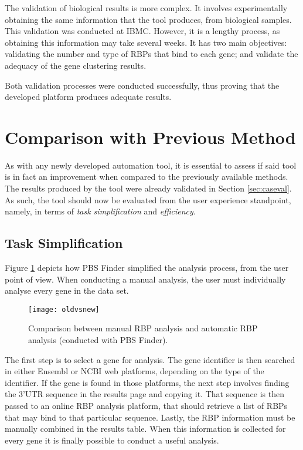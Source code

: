 The validation of biological results is more complex. It involves experimentally
obtaining the same information that the tool produces, from biological samples.
This validation was conducted at IBMC. However, it is a lengthy process, as
obtaining this information may take several weeks. It has two main objectives:
validating the number and type of RBPs that bind to each gene; and validate the
adequacy of the gene clustering results.

Both validation processes were conducted successfully, thus proving that the
developed platform produces adequate results.

\section{Comparison with Previous Method}\label{sec:caseperf}

As with any newly developed automation tool, it is essential to assess if said
tool is in fact an improvement when compared to the previously available
methods. The results produced by the tool were already validated in Section
\ref{sec:caseval}. As such, the tool should now be evaluated from the user
experience standpoint, namely, in terms of \emph{task simplification} and
\emph{efficiency}.

\subsection{Task Simplification}

Figure \ref{fig:oldvsnew} depicts how PBS Finder simplified the analysis process,
from the user point of view. When conducting a manual analysis, the user must
individually analyse every gene in the data set.

\begin{figure}[!htb]
  \begin{center}
    \leavevmode
    \texttt{[image: oldvsnew]}
    \caption[Comparison between manual RBP analysis and automatic RBP analysis (conducted with PBS Finder)]{
      Comparison between manual RBP analysis and automatic RBP analysis
      (conducted with PBS Finder).
    }
    \label{fig:oldvsnew}
  \end{center}
\end{figure}

The first step is to select a gene for analysis. The gene identifier is then
searched in either Ensembl or NCBI web platforms, depending on the type of the
identifier. If the gene is found in those platforms, the next step involves
finding the 3'UTR sequence in the results page and copying it. That sequence is
then passed to an online RBP analysis platform, that should retrieve a list of
RBPs that may bind to that particular sequence. Lastly, the RBP information must
be manually combined in the results table. When this information is collected
for every gene it is finally possible to conduct a useful analysis.

